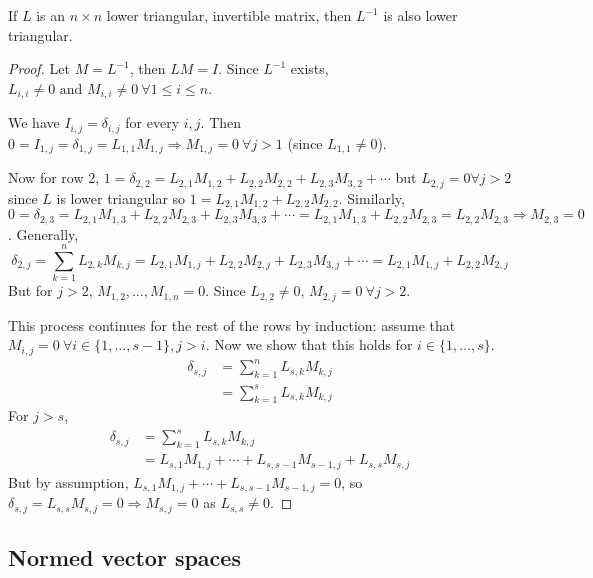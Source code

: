 \begin{proposition}
	If $L$ is an $n \times n$ lower triangular, invertible matrix, then $L^{-1}$ is also lower triangular.
\end{proposition}

\begin{proof}
	Let $M = L^{-1}$, then $LM = I$. Since $L^{-1}$ exists, $L_{i, i} \ne 0 \text{ and } M_{i, i} \ne 0 \ \forall 1 \le i \le n$.

	We have $I_{i, j} = \delta_{i, j}$ for every $i, j$. Then $0 = I_{1, j} = \delta_{1, j} = L_{1, 1} M_{1, j} \Rightarrow M_{1, j} = 0 \ \forall j > 1$ (since $L_{1, 1} \ne 0$).

	Now for row 2, $1 = \delta_{2, 2} = L_{2, 1} M_{1, 2} + L_{2, 2} M_{2, 2} + L_{2, 3} M_{3, 2} + \cdots$ but $L_{2, j} = 0 \forall j > 2$ since $L$ is lower triangular so $1 = L_{2, 1} M_{1, 2} + L_{2, 2} M_{2, 2}$. Similarly, $0 = \delta_{2, 3} = L_{2, 1} M_{1, 3} + L_{2, 2} M_{2, 3} + L_{2, 3} M_{3, 3} + \cdots = L_{2, 1} M_{1, 3} + L_{2, 2} M_{2, 3} = L_{2, 2} M_{2, 3} \Rightarrow M_{2, 3} = 0$. Generally,
	\[
		\delta_{2, j} = \sum_{k = 1}^{n} L_{2, k} M_{k, j} = L_{2, 1} M_{1, j} + L_{2, 2} M_{2, j} + L_{2, 3} M_{3, j} + \cdots = L_{2, 1} M_{1, j} + L_{2, 2} M_{2, j}
	\]
	But for $j > 2$, $M_{1, 2}, \dots, M_{1, n} = 0$. Since $L_{2, 2} \ne 0$, $M_{2, j} = 0 \ \forall j > 2$.

	This process continues for the rest of the rows by induction: assume that $M_{i, j} = 0 \ \forall i \in \{ 1, \dots, s - 1 \}, j > i$. Now we show that this holds for $i \in \{ 1, \dots, s \}$.
	\[
		\begin{aligned}
			\delta_{s, j}
				& = \sum_{k = 1}^{n} L_{s, k} M_{k, j} \\
				& = \sum_{k = 1}^{s} L_{s, k} M_{k, j}
		\end{aligned}
	\]
	For $j > s$,
	\[
		\begin{aligned}
			\delta_{s, j}
				& = \sum_{k = 1}^{s} L_{s, k} M_{k, j} \\
				& = L_{s, 1} M_{1, j} + \cdots + L_{s, s - 1} M_{s - 1, j} + L_{s, s} M_{s, j}
		\end{aligned}
	\]
	But by assumption, $L_{s, 1} M_{1, j} + \cdots + L_{s, s - 1} M_{s - 1, j} = 0$, so $\delta_{s, j} = L_{s, s} M_{s, j} = 0 \Rightarrow M_{s, j} = 0$ as $L_{s, s} \ne 0$.
\end{proof}

\subsection{Normed vector spaces}

